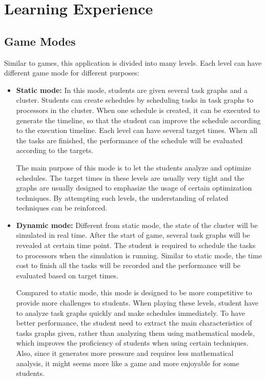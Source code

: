 \documentclass[msc,deptreport, cs]{infthesis}
\begin{document}
\section{Learning Experience}

\subsection{Game Modes} \label{sec:modes}

Similar to games, this application is divided into many levels. Each level can have different game mode for different purposes:

\begin{itemize}
  \item \textbf{Static mode:} In this mode, students are given several task graphs and a cluster. Students can create schedules by scheduling tasks in task graphs to processors in the cluster. When one schedule is created, it can be executed to generate the timeline, so that the student can improve the schedule according to the execution timeline. Each level can have several target times. When all the tasks are finished, the performance of the schedule will be evaluated according to the targets.
  
  The main purpose of this mode is to let the students analyze and optimize schedules. The target times in these levels are usually very tight and the graphs are usually designed to emphasize the usage of certain optimization techniques. By attempting such levels, the understanding of related techniques can be reinforced.

  \item \textbf{Dynamic mode:} Different from static mode, the state of the cluster will be simulated in real time. After the start of game, several task graphs will be revealed at certain time point. The student is required to schedule the tasks to processors when the simulation is running. Similar to static mode, the time cost to finish all the tasks will be recorded and the performance will be evaluated based on target times.
  
  Compared to static mode, this mode is designed to be more competitive to provide more challenges to students. When playing these levels, student have to analyze task graphs quickly and make schedules immediately. To have better performance, the student need to extract the main characteristics of tasks graphs given, rather than analyzing them using mathematical models, which improves the proficiency of students when using certain techniques. Also, since it generates more pressure and requires less mathematical analysis, it might seems more like a game and more enjoyable for some students.


\end{itemize}
\end{document}

